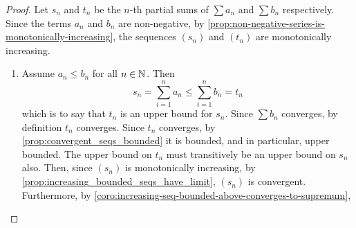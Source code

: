 \documentclass[../MathsNotesBase.tex]{subfiles}
\begin{document}
{		\nl[20]
		\label{ssssection:convergence-tests-for-non-negative-series}
		\bigskip
		\begin{proof}\nl
			Let $s_n$ and $t_n$ be the $n$-th partial sums of ${ \sum a_n }$ and ${ \sum b_n }$ respectively. Since the terms $a_n$ and $b_n$ are non-negative, by \autoref{prop:non-negative-series-is-monotonically-increasing}, the sequences $(s_n)$ and $(t_n)$ are monotonically increasing.
			\begin{enumerate}[label=(\roman*)]
				\item Assume ${ a_n \leq b_n }$ for all ${ n \in \mathbb{N}^{} }$. Then
					\[ s_n = \sum_{i=1}^n a_n \leq \sum_{i=1}^n b_n = t_n \]
					which is to say that $t_n$ is an upper bound for $s_n$. Since ${ \sum b_n }$ converges, by definition $t_n$ converges. Since $t_n$ converges, by \autoref{prop:convergent_seqs_bounded} it is bounded, and in particular, upper bounded. The upper bound on $t_n$ must transitively be an upper bound on $s_n$ also. Then, since $(s_n)$ is monotonically increasing, by \autoref{prop:increasing_bounded_seqs_have_limit}, $(s_n)$ is convergent. Furthermore, by \autoref{coro:increasing-seq-bounded-above-converges-to-supremum},

\end{enumerate}
\end{proof}}
\end{document}
